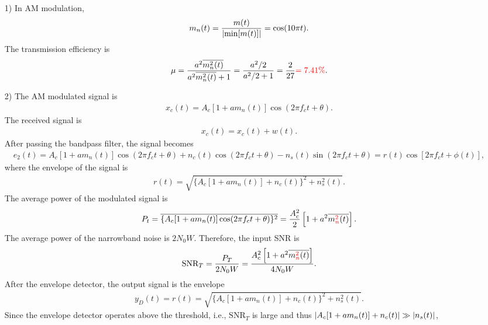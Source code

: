 \documentclass{assignment}
\begin{document}
\begin{sol}
    \begin{itemize}
        \item[1)] In AM modulation,
        \begin{align}
            m_n(t)=\frac{m(t)}{\left\lvert\min[m(t)]\right\rvert}=\cos(10\pi t).
        \end{align}
        The transmission efficiency is
        \begin{align}
            \mu=\frac{a^2\overline{m_n^2(t)}}{a^2\overline{m_n^2(t)}+1}=\frac{a^2/2}{a^2/2+1}=\frac{2}{27}{\color{red}=7.41\%}.
        \end{align}
        \item[2)] The AM modulated signal is
        \begin{align}
            x_c(t)=A_c[1+am_n(t)]\cos(2\pi f_ct+\theta).
        \end{align}
        The received signal is
        \begin{align}
            x_c(t)=x_c(t)+w(t).
        \end{align}
        After passing the bandpass filter, the signal becomes
        \begin{align}
            e_2(t)=A_c[1+am_n(t)]\cos(2\pi f_ct+\theta)+n_c(t)\cos(2\pi f_ct+\theta)-n_s(t)\sin(2\pi f_ct+\theta)=r(t)\cos[2\pi f_ct+\phi(t)],
        \end{align}
        where the envelope of the signal is
        \begin{align}
            r(t)=\sqrt{\{A_c[1+am_n(t)]+n_c(t)\}^2+n_s^2(t)}.
        \end{align}
        The average power of the modulated signal is
        \begin{align}
            P_t=\overline{\{A_c[1+am_n(t)]\cos(2\pi f_ct+\theta)\}^2}=\frac{A_c^2}{2}\left[1+a^2\overline{m_n^{\color{red}2}(t)}\right].
        \end{align}
        The average power of the narrowband noise is $2N_0W$. Therefore, the input SNR is
        \begin{align}
            \text{SNR}_T=\frac{P_T}{2N_0W}=\frac{A_c^2\left[1+a^2\overline{m_n^{\color{red}2}(t)}\right]}{4N_0W}.
        \end{align}
        After the envelope detector, the output signal is the envelope
        \begin{align}
            y_D(t)=r(t)=\sqrt{\{A_c[1+am_n(t)]+n_c(t)\}^2+n_s^2(t)}.
        \end{align}
        Since the envelope detector operates above the threshold, i.e., $\text{SNR}_T$ is large and thus $\left\lvert A_c[1+am_n(t)]+n_c(t)\right\rvert\gg\left\lvert n_s(t)\right\rvert$,

\end{itemize}
\end{sol}
\end{document}
